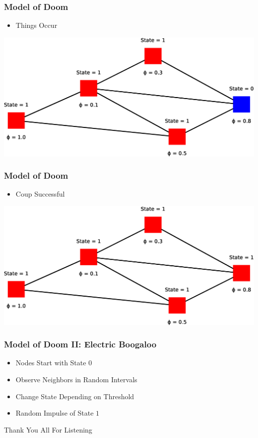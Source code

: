 \documentclass[slidestop,usenames,dvipsnames]{beamer}
\newcommand{\fitem}{\pause\vfill\item}
\newcommand{\gitem}{\vfill\item}
\begin{document}
\begin{frame}
    \frametitle{Model of Doom}
    \begin{itemize}
        \gitem Things Occur
    \end{itemize}
    \vfill
    \includegraphics[width=\textwidth]{img/model8}
    \vfill
\end{frame}

\begin{frame}
    \frametitle{Model of Doom}
    \begin{itemize}
        \gitem Coup Successful
    \end{itemize}
    \vfill
    \includegraphics[width=\textwidth]{img/model9}
    \vfill
\end{frame}


\begin{frame}
    \frametitle{Model of Doom II: Electric Boogaloo}
    \begin{itemize}
        \fitem Nodes Start with State $0$
        \fitem Observe Neighbors in Random Intervals
        \fitem Change State Depending on Threshold
        \fitem Random Impulse of State $1$
    \end{itemize}
    \vfill
\end{frame}




\begin{frame}
    \vfill
    \begin{center}
        {\Huge Thank You All For Listening}\
    \end{center}
\end{frame}
\end{document}
